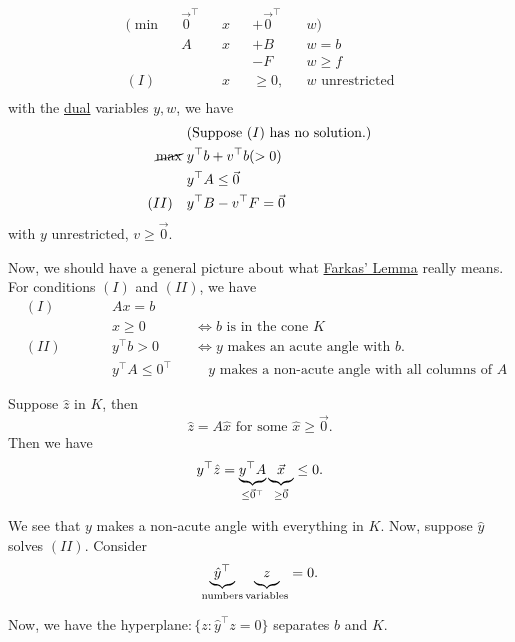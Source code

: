 \begin{eg}
	\[
		\begin{alignedat}{4}
			(\min~   & \vec{0}^{\top} &&x &&+ \vec{0}^{\top} &&w)            \\
			& A&&x &&+ B&&w = b    \\
			& && &&-F&&w \geq f \\
			(I)\quad & &&x&&\geq  0, &&w\text{ unrestricted}          \\
		\end{alignedat}
	\]
	with the \hyperref[def:dual]{dual} variables \(y, w\), we have
	\begin{align*}
		               & (\text{Suppose \((I)\) has no solution.}) \\
		\cancel{\max}~ & y^{\top} b + v^{\top} b (>0)              \\
		               & y^{\top} A \leq \vec{0}                   \\
		(II)\quad      & y^{\top} B - v^{\top} F = \vec{0}
	\end{align*}
	with \(y\) unrestricted, \(v\geq  \vec{0}\).
\end{eg}

Now, we should have a general picture about what \hyperref[lma:Farkas-lemma]{Farkas' Lemma} really means. For conditions \((I)\) and \((II)\), we have
\[
	\begin{alignedat}{3}
		& (I) \qquad&& Ax = b       \\
		&      && x\geq 0    && \iff b \text{ is in the cone }K \\
		& (II) \qquad&& y^{\top}b> 0 &&\iff y \text{ makes an acute angle with }b.\\
		&      && y^{\top}A\leq 0^{\top}&&\quad y\text{ makes a non-acute angle with all columns of }A
	\end{alignedat}
\]

Suppose \(\hat{z}\) in \(K\), then
\[
	\hat{z} = A \hat{x} \text{ for some }\hat{x} \geq  \vec{0}.
\]
Then we have
\[
	y^{\top} \hat{z} = \underbrace{y^{\top} A}_{\leq\vec{0}^{\top}} \underbrace{\vphantom{y}\vec{x}}_{\geq  \vec{0}}  \leq 0.
\]

We see that \(y\) makes a non-acute angle with everything in \(K\). Now, suppose \(\hat{y}\) solves \((II)\). Consider
\[
	\underbrace{\hat{y}^{\top}}_{\text{numbers}} \underbrace{\vphantom{y}z}_{\text{variables}} = 0.
\]

Now, we have the hyperplane\(\colon\)\(\{z\colon \hat{y} ^{\top} z = 0\}\) separates \(b\) and \(K\).

